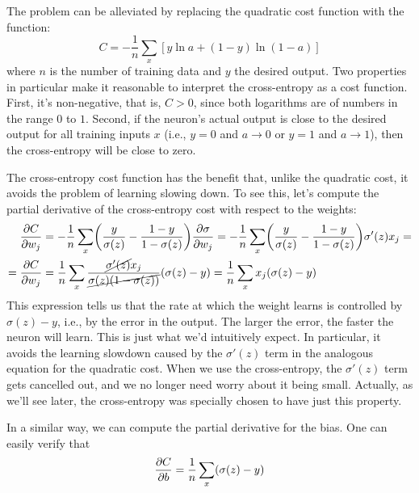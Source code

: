 The problem can be alleviated by replacing the quadratic cost function with the  function:
\begin{equation}
C =- \frac{1}{n} \sum_x \left[ y \ln a + (1-y) \ln(1-a)\right]
\end{equation}
where $n$ is the number of training data and $y$ the desired output. Two properties in particular make it reasonable to interpret the cross-entropy as a cost function. First, it's non-negative, that is, $C>0$,  since both logarithms are of numbers in the range $0$ to $1$. Second, if the neuron's actual output is close to the desired output for all training inputs $x$ (i.e., $y=0$ and $a\rightarrow 0$ or $y=1$ and $a\rightarrow 1$), then the cross-entropy will be close to zero.

The cross-entropy cost function has the benefit that, unlike the quadratic cost, it avoids the problem of learning slowing down. To see this, let's compute the partial derivative of the cross-entropy cost with respect to the weights:
\begin{equation}
\begin{aligned}
\frac{\partial C}{\partial w_j} &= - \frac{1}{n} \sum_x \br{ \frac{y}{\sigma(z)} -\frac{1-y}{1-\sigma(z)}} \frac{\partial\sigma}{\partial w_j} =  - \frac{1}{n} \sum_x \br{ \frac{y}{\sigma(z)} -\frac{1-y}{1-\sigma(z)}} \sigma'(z) x_j =\\
= \frac{\partial C}{\partial w_j} &= \frac{1}{n} \sum_x\frac{\cancel{\sigma'(z)} x_j}{\cancel{\sigma(z)\br{1-\sigma(z)}}}\br{\sigma(z) - y} = \frac{1}{n} \sum_x x_j \br{\sigma(z) - y}
\end{aligned} 
\end{equation}
This expression tells us that the rate at which the weight learns is controlled by $\sigma(z)-y$, i.e., by the error in the output. The larger the error, the faster the neuron will learn. This is just what we'd intuitively expect. In particular, it avoids the learning slowdown caused by the $\sigma'(z)$ term in the analogous equation for the quadratic cost. When we use the cross-entropy, the $\sigma'(z)$ term gets cancelled out, and we no longer need worry about it being small. Actually, as we'll see later, the cross-entropy was specially chosen to have just this property.

In a similar way, we can compute the partial derivative for the bias. One can easily verify that
\begin{equation}
\frac{\partial C}{\partial b} = \frac{1}{n} \sum_x \br{\sigma(z)-y}
\end{equation}

